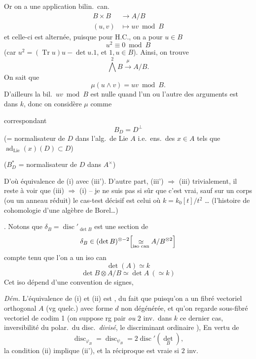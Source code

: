 \documentclass[11pt,a4paper]{article}
\begin{document}
Or on a une application bilin.\ can.
\[
\begin{aligned}
B\times B &\longrightarrow A/B\\
(u,v)&\longmapsto uv \bmod B
\end{aligned}
\]
et celle-ci est alternée, puisque pour H.C., on a pour $u\in B$
\[
u^{2}\equiv 0 \bmod B
\]
(car $u^{2}=(\operatorname{Tr}u)u-\det u.1$, et $1,u\in B$). Ainsi, on trouve
\[
\textstyle\bigwedge^{2}B\xrightarrow{\ \mu\ }A/B .
\]
On sait que
\[
\mu(u\wedge v)=uv \bmod B .
\]
D'ailleurs \struck{\ill{}} la  bil.\ $uv \bmod B$ est nulle quand l'un ou l'autre des arguments est dans $k$, donc on  considère $\mu$ comme

correspondant
\[
B_{D}=D^{\perp}
\]
(= normalisateur de $D$ dans l'alg.\ de Lie $A$ i.e.\ ens.\ des $x\in A$ tels que  $\operatorname{ad}_{\mathrm{Lie}}(x)(D)\subset D$)

($B_{D}^{*}$ = normalisateur de $D$ dans $A^{\times}$)

D'où équivalence de (i) avec (iii'). D'autre part, (iii') $\Longrightarrow$ (iii) trivialement, il reste à voir que (iii) $\Longrightarrow$ (i) --  je ne suis pas si sûr que c'est vrai, sauf sur un corps (ou un anneau réduit) le cas-test décisif est celui où $k=k_{0}[t]/t^{2}$ … (l'histoire de cohomologie d'une algèbre de Borel…)

. Notons que $\delta_{B}=\operatorname{disc}'_{\det B}$ est une section de
\[
\delta_{B}\in(\det B)^{\otimes -2}\Bigl[\underset{\text{iso can}}{\simeq} A/B^{\otimes 2}\Bigr]
\]
compte tenu que l'on a un iso can
\[
\det(A)\simeq k
\]
\[
\det B\otimes A/B\simeq\det A\ (\simeq k)
\]
Cet iso dépend d'une convention de signes,

\emph{Dém.} L'équivalence de (i) et (ii) est , du fait que puisqu'on a un fibré vectoriel orthogonal $A$ (vg quelc.) avec forme $d$ non dégénérée, et qu'on regarde    sous-fibré vectoriel de codim 1 (on suppose rg pair \emph{ou} $2$ inv.\ dans $k$   ce dernier cas, inversibilité du polar.\ du disc.\ \emph{divisé}, le discriminant ordinaire ), \struck{\ill{}} En vertu de
\[
\operatorname{disc}_{\varphi_{B}}=\operatorname{disc}_{\psi_{B}}=2\operatorname{disc}'(\det_{B}),
\]
la condition (ii) implique (ii'), et la réciproque est vraie si $2$ inv.
\end{document}
